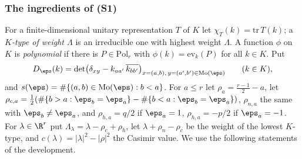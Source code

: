 \subsubsection*{The ingredients of (S1)}

For a finite-dimensional unitary representation $T$ of $K$ let $\chi_T(k)=\mathrm{tr}\,T(k)$; a \emph{$K$-type of weight
$\Lambda$} is an irreducible one with highest weight $\Lambda$. A function $\phi$ on $K$ is \emph{polynomial} if there is
$P\in\mathrm{Pol}_r$ with $\phi(k)=\mathrm{ev}_k(P)$ for all $k\in K$. Put
\begin{equation}\label{pf:multnc:eq-Deps}
D_\eps(k)=\det\bigl(\delta_{xy}-k_{aa'}\,\overline{k_{bb'}}\bigr)_{x=(a,b),\,y=(a',b')\in\mathrm{Mo}(\eps)}\qquad(k\in K),
\end{equation}
and $s(\eps)=\#\{(a,b)\in\mathrm{Mo}(\eps):b<a\}$. For $a\le r$ let $\rho_a=\frac{r-1}2-a$, let
$\rho_{c,a}=\frac12(\#\{b>a:\eps_b=\eps_a\}-\#\{b<a:\eps_b=\eps_a\})$, $\rho_{n,a}$ the same with $\eps_b\ne\eps_a$, and
$\rho_{h,a}=q/2$ if $\eps_a=1$, $\rho_{h,a}=-p/2$ if $\eps_a=-1$. For $\lambda\in\R^r$ put
$\Lambda_\lambda=\lambda-\rho_c+\rho_h$, let $\lambda+\rho_n-\rho_c$ be the weight of the lowest $K$-type, and
$c(\lambda)=|\lambda|^2-|\rho|^2$ the Casimir value. We use the following statements of the development.
